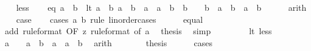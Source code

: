 \begin{isabellebody}
\ \ \isamarkupfalse%
\ less\isanewline
\ \ \isamarkupfalse%
\ {\isacharparenleft}{\kern0pt}eq{\isacharparenright}{\kern0pt}\ {\isachardoublequoteopen}a\ {\isacharequal}{\kern0pt}\ b{\isachardoublequoteclose}\ {\isacharbar}{\kern0pt}\ {\isacharparenleft}{\kern0pt}lt{\isacharparenright}{\kern0pt}\ {\isachardoublequoteopen}a\ {\isacharless}{\kern0pt}\ b{\isachardoublequoteclose}\ {\isachardoublequoteopen}a\ {\isacharplus}{\kern0pt}\ b\ {\isacharminus}{\kern0pt}\ a\ {\isacharless}{\kern0pt}\ a\ {\isacharplus}{\kern0pt}\ b{\isachardoublequoteclose}\ {\isacharbar}{\kern0pt}\ {\isachardoublequoteopen}b\ {\isacharequal}{\kern0pt}\ {}{\isachardoublequoteclose}\ {\isacharbar}{\kern0pt}\ {\isachardoublequoteopen}b\ {\isacharplus}{\kern0pt}\ a\ {\isacharminus}{\kern0pt}\ b\ {\isacharless}{\kern0pt}\ a\ {\isacharplus}{\kern0pt}\ b{\isachardoublequoteclose}\isanewline
\ \ \ \ \isamarkupfalse%
\ arith\isanewline
\ \ \isamarkupfalse%
\ {\isacharquery}{\kern0pt}case\isanewline
\ \ \isamarkupfalse%
\ {\isacharparenleft}{\kern0pt}cases\ a\ b\ rule{\isacharcolon}{\kern0pt}\ linorder{\isacharunderscore}{\kern0pt}cases{\isacharparenright}{\kern0pt}\isanewline
\ \ \ \ \isamarkupfalse%
\ equal\isanewline
\ \ \ \ \isamarkupfalse%
\ add\ {\isacharbrackleft}{\kern0pt}rule{\isacharunderscore}{\kern0pt}format{\isacharcomma}{\kern0pt}\ OF\ z\ {\isacharbrackleft}{\kern0pt}rule{\isacharunderscore}{\kern0pt}format{\isacharcomma}{\kern0pt}\ of\ a{\isacharbrackright}{\kern0pt}{\isacharbrackright}{\kern0pt}\ \isamarkupfalse%
\ {\isacharquery}{\kern0pt}thesis\ \isamarkupfalse%
\ simp\isanewline
\ \ \isamarkupfalse%
\isanewline
\ \ \ \ \isamarkupfalse%
\ lt{\isacharcolon}{\kern0pt}\ less\isanewline
\ \ \ \ \isamarkupfalse%
\ \isamarkupfalse%
\ {\isachardoublequoteopen}a\ {\isacharequal}{\kern0pt}\ {}{\isachardoublequoteclose}\ {\isacharbar}{\kern0pt}\ {\isachardoublequoteopen}a\ {\isacharplus}{\kern0pt}\ b\ {\isacharminus}{\kern0pt}\ a\ {\isacharless}{\kern0pt}\ a\ {\isacharplus}{\kern0pt}\ b{\isachardoublequoteclose}\ \isamarkupfalse%
\ arith\isanewline
\ \ \ \ \isamarkupfalse%
\ \isamarkupfalse%
\ {\isacharquery}{\kern0pt}thesis\isanewline
\ \ \ \ \isamarkupfalse%
\ cases\isanewline
\ \ \ \ \ \ \isamarkupfalse%
\ {}\isanewline
\ \ \ \ \ \ \isamarkupfalse%

\end{isabellebody}
